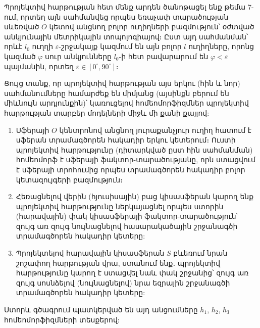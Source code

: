 \documentclass[./main.tex]{subfiles}
\begin{document}
\begin{note}
Պրոյեկտիվ հարթության հետ մենք արդեն ծանոթացել ենք թե\-մա 7-ում, որտեղ այն սահմանվեց որպես եռաչափ տարածության սևեռված $O$ կե\-տով անցնող բոլոր ուղիղների բազմություն՝ օժտված անկյունային մետրիկային տոպոլոգիայով։ Ըստ այդ սահմանման՝ որևէ $l_0$ ուղղի $\varepsilon$-շրջակայք կազմում են այն բոլոր $l$ ուղիղները, որոնց կազմած $\varphi$ սուր անկյունները $l_0$-ի հետ բավարարում են $\varphi < \varepsilon$ պայմանին, որտեղ $\varepsilon \in [0^\circ, 90^\circ]$։


\newpage

\par Ցույց տանք, որ պրոյեկտիվ հարթության այս երկու (հին և նոր) սահմանումնե\-րը համարժեք են միմյանց (այսինքն բերում են միևնույն արդյունքին)՝ կառուցելով հո\-մեո\-մորֆիզմներ պրոյեկտիվ հարթության տարբեր մոդելների միջև մի քանի քայ\-լով:

\begin{enumerate}
\item[1․] Սֆերայի $O$ կենտրոնով անցնող յուրաքանչյուր ուղիղ հատում է սֆերան տրա\-մա\-գծորեն հակադիր երկու կետերում։ Ուստի պրոյեկտիվ հարթությունը (դի\-տարկ\-ված ըստ հին սահմանման) հոմեոմորֆ է սֆերայի ֆակտոր-տարա\-ծու\-թյա\-նը, որն ստացվում է սֆերայի տրոհումից որպես տրամագծորեն հակա\-դիր բո\-լոր կետա\-զույ\-գերի բազմություն։

\item[2.] Հեռացնելով վերին (հյուսիսային) բաց կիսասֆերան կարող ենք պրոյեկտիվ հարթությունը ներկայացնել որպես ստորին (հարավային) փակ կիսասֆերայի ֆակտոր-տարածություն՝ զույգ առ զույգ նույնացնելով հասարակածային շրջա\-նագծի տրամագծորեն հակադիր կետերը:

\item[3.] Պրոյեկտելով հարավային կիսասֆերան $S$ բևեռում նրան շոշափող հար\-թու\-թյան վրա, ստանում ենք․ պրոյեկտիվ հարթությունը կարող է ստացվել նաև փակ շրջանից՝ զույգ առ զույգ սոսնձելով (նույնացնելով) նրա եզրային շրջա\-նա\-գծի տրամագծորեն հակադիր կետերը:
\end{enumerate}

\par Ստորև գծագրում պատկերված են այդ անցումները $h_1$, $h_2$, $h_3$ հոմեոմորֆիզմ\-ների տեսքերով:

\begin{center}
 \noindent\hspace*{-3cm}
\end{center}

\end{note}
\end{document}
